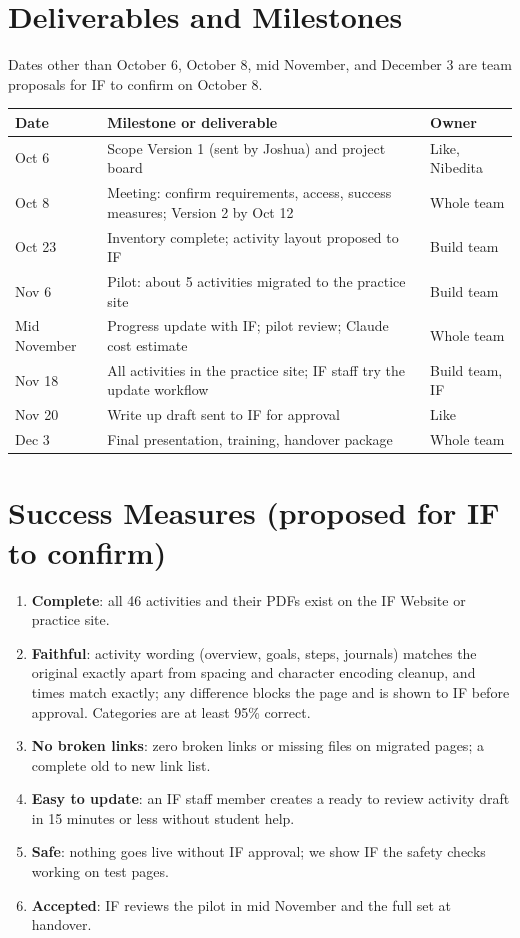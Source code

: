 \section{Deliverables and Milestones}
Dates other than October 6, October 8, mid November, and December 3 are team proposals for IF to confirm on October 8.

\begin{tabularx}{\textwidth}{@{}P{2.4cm}LP{2.8cm}@{}}
\toprule
\textbf{Date} & \textbf{Milestone or deliverable} & \textbf{Owner} \\
\midrule
Oct 6 & Scope Version 1 (sent by Joshua) and project board & Like, Nibedita \\
Oct 8 & Meeting: confirm requirements, access, success measures; Version 2 by Oct 12 & Whole team \\
Oct 23 & Inventory complete; activity layout proposed to IF & Build team \\
Nov 6 & Pilot: about 5 activities migrated to the practice site & Build team \\
Mid November & Progress update with IF; pilot review; Claude cost estimate & Whole team \\
Nov 18 & All activities in the practice site; IF staff try the update workflow & Build team, IF \\
Nov 20 & Write up draft sent to IF for approval & Like \\
Dec 3 & Final presentation, training, handover package & Whole team \\
\bottomrule
\end{tabularx}

\section{Success Measures (proposed for IF to confirm)}
\begin{enumerate}
  \item \textbf{Complete}: all 46 activities and their PDFs exist on the IF Website or practice site.
  \item \textbf{Faithful}: activity wording (overview, goals, steps, journals) matches the original exactly apart from spacing and character encoding cleanup, and times match exactly; any difference blocks the page and is shown to IF before approval. Categories are at least 95\% correct.
  \item \textbf{No broken links}: zero broken links or missing files on migrated pages; a complete old to new link list.
  \item \textbf{Easy to update}: an IF staff member creates a ready to review activity draft in 15 minutes or less without student help.
  \item \textbf{Safe}: nothing goes live without IF approval; we show IF the safety checks working on test pages.
  \item \textbf{Accepted}: IF reviews the pilot in mid November and the full set at handover.
\end{enumerate}

